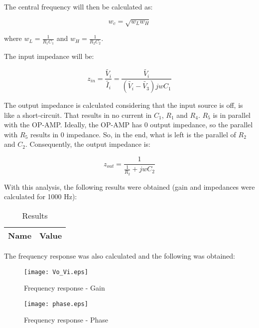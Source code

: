 The central frequency will then be calculated as:

\begin{equation}
        w_c = \sqrt{w_Lw_H}
\end{equation}

where $w_L=\frac{1}{R_1C_1}$ and $w_H=\frac{1}{R_2C_2}$.

The input impedance will be: 

\begin{equation}
        z_{in} = \frac{\widetilde{V_i}}{\widetilde{I_i}} = \frac{\widetilde{V_i}}{(\widetilde{V_i}-\widetilde{V_3})jwC_1}
\end{equation}

The output impedance is calculated considering that the input source is off, is like a short-circuit. That results in no current in $C_1$, $R_1$ and $R_4$. $R_5$ is in parallel with the OP-AMP. Ideally, the OP-AMP has 0 output impedance, so the parallel with $R_5$ results in 0 impedance. So, in the end, what is left is the parallel of $R_2$ and $C_2$. Consequently, the output impedance is:

\begin{equation}
        z_{out} = \frac{1}{\frac{1}{R_2}+jwC_2}
\end{equation}

With this analysis, the following results were obtained (gain and impedances were calculated for 1000 Hz):

\begin{table}[H]
  \centering
  \begin{tabular}{|c|c|}
    \hline
        {\bf Name} & {\bf Value} \\
        \hline
        \hline
        
        \hline
  \end{tabular}
  \caption{Results}
  \label{teo_results}
\end{table}

The frequency response was also calculated and the following was obtained:

\begin{figure}[H]
        \centering
        \texttt{[image: Vo\_Vi.eps]}
        \caption{Frequency response - Gain}
        \label{tfrg}
\end{figure}

\begin{figure}[H]
        \centering
        \texttt{[image: phase.eps]}
        \caption{Frequency response - Phase}
        \label{tfrf}
\end{figure}


